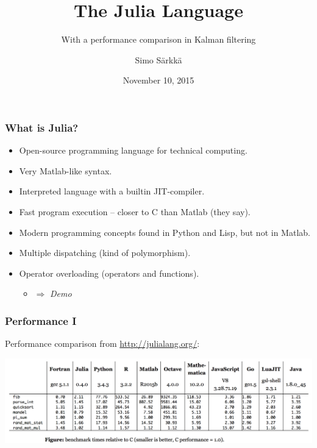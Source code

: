 \documentclass[xcolor=svgnames,english,presentation]{beamer}
\title{The Julia Language}
\subtitle{With a performance comparison in Kalman filtering}
\author{Simo S\"arkk\"a}
\institute{Aalto University} %
\date{November 10, 2015}
\begin{document}

\begin{frame}
  \titlepage
\end{frame}



\begin{frame}
  \frametitle{What is Julia?}

  \begin{itemize}[<+->]       
  \item Open-source \alert{programming language} for technical computing.
  \item Very \alert{Matlab-like} syntax.
  \item Interpreted language with a builtin \alert{JIT-compiler}.
  \item \alert{Fast program execution} -- closer to C than Matlab (they say).
  \item \alert{Modern programming concepts} found in Python and Lisp, but not in Matlab.
  \item \alert{Multiple dispatching} (kind of polymorphism).
  \item \alert{Operator overloading} (operators and functions).
  \begin{itemize}[<+->]       
  \item $\Rightarrow$ {\it Demo}
  \end{itemize}
  \end{itemize}

\end{frame}

\begin{frame}
  \frametitle{Performance I}
  \centering
  Performance comparison from \url{http://julialang.org/}: 

  \vspace{0.5cm}

  \includegraphics[width=\textwidth]{perf}
\end{frame}
\end{document}
